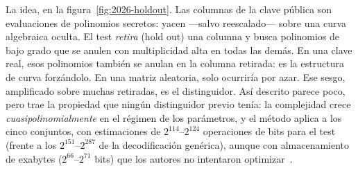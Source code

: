 La idea, en la figura~\ref{fig:2026-holdout}. Las columnas de la
clave pública son evaluaciones de polinomios secretos: yacen
---salvo reescalado--- sobre una curva algebraica oculta. El test
\emph{retira} (hold out) una columna y busca polinomios de bajo
grado que se anulen con multiplicidad alta en todas las demás. En
una clave real, esos polinomios también se anulan en la columna
retirada: es la estructura de curva forzándolo. En una matriz
aleatoria, solo ocurriría por azar. Ese sesgo, amplificado sobre
muchas retiradas, es el distinguidor. Así descrito parece poco,
pero trae la propiedad que ningún distinguidor previo tenía: la
complejidad crece \emph{cuasipolinomialmente} en el régimen de los
parámetros, y el método aplica a los cinco conjuntos, con
estimaciones de $2^{114}$--$2^{124}$ operaciones de bits para el
test (frente a los $2^{151}$--$2^{287}$ de la decodificación
genérica), aunque con almacenamiento de exabytes ($2^{66}$--$2^{71}$
bits) que los autores no intentaron optimizar~\cite{ghoshal2026}.

